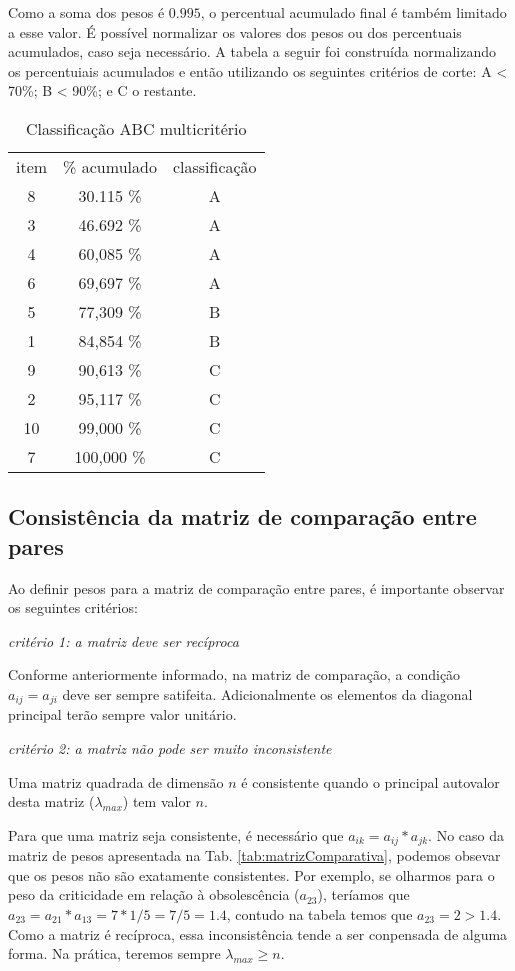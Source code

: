 \documentclass{book}
\begin{document}
Como a soma dos pesos é $0.995$, o percentual acumulado final é também limitado a esse valor. É possível normalizar os valores dos pesos ou dos percentuais acumulados, caso seja necessário. A tabela a seguir foi construída normalizando os percentuiais acumulados e então utilizando os seguintes critérios de corte: A < 70\%; B < 90\%; e C o restante.

\begin{table}[h]
\begin{center}
\begin{tabular}[c]{c c c }
item & \% acumulado & classificação \\
 8 &  30.115 \% & A \\
 3 &  46.692 \% & A \\
 4 &  60,085 \% & A \\
 6 &  69,697 \% & A \\
 5 &  77,309 \% & B \\
 1 &  84,854 \% & B \\
 9 &  90,613 \% & C \\
 2 &  95,117 \% & C \\
10 &  99,000 \% & C \\
 7 & 100,000 \% & C \\
\end{tabular}
\caption{Classificação ABC multicritério}
\label{tab:classABCMult}
\end{center}
\end{table}

\subsection{Consistência da matriz de comparação entre pares}

Ao definir pesos para a matriz de comparação entre pares, é importante observar os seguintes critérios:

\emph{critério 1: a matriz deve ser recíproca}

Conforme anteriormente informado, na matriz de comparação, a condição $a_{ij} = a_{ji}$ deve ser sempre satifeita. Adicionalmente os elementos da diagonal principal terão sempre valor unitário.

\emph{critério 2: a matriz não pode ser muito inconsistente}

Uma matriz quadrada de dimensão $n$ é consistente quando o principal autovalor desta matriz ($\lambda_{max}$) tem valor $n$.

Para que uma matriz seja consistente, é necessário que $a_{ik} = a_{ij} * a_{jk}$. No caso da matriz de pesos apresentada na Tab. \ref{tab:matrizComparativa}, podemos obsevar que os pesos não são exatamente consistentes. Por exemplo, se olharmos para o peso da criticidade em relação à obsolescência ($a_{23}$), teríamos que $a_{23} = a_{21} * a_{13} = 7 * 1/5 = 7/5 = 1.4$, contudo na tabela temos que $a_{23} = 2 > 1.4$. Como a matriz é recíproca, essa inconsistência tende a ser conpensada de alguma forma. Na prática, teremos sempre $\lambda_{max} \geq n$.
\end{document}
